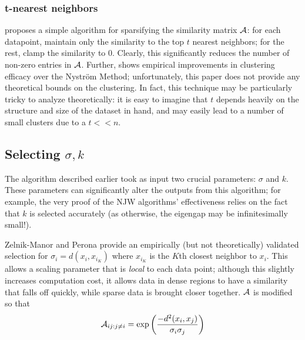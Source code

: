 \subsubsection{t-nearest neighbors}
\cite{song2008parallel} proposes a simple algorithm for sparsifying the similarity matrix
$\mathcal{A}$: for each datapoint, maintain only the similarity to the top $t$ nearest
neighbors; for the rest, clamp the similarity to $0$. Clearly, this significantly
reduces the number of non-zero entries in $\mathcal{A}$. Further,
\cite{song2008parallel} shows empirical improvements in clustering efficacy
over the Nystr\"{o}m Method; unfortunately, this paper does not provide any
theoretical bounds on the clustering. In fact, this technique may be
particularly tricky to analyze theoretically: it is easy to imagine that $t$
depends heavily on the structure and size of the dataset in hand, and may
easily lead to a number of small clusters due to a $t << n$.

\subsection{Selecting $\sigma, k$}
The algorithm described earlier took as input two crucial parameters: $\sigma$
and $k$. These parameters can significantly alter the outputs from this
algorithm; for example, the very proof of the NJW algorithms' effectiveness
relies on the fact that $k$ is selected accurately (as otherwise, the eigengap
may be infinitesimally small!).

Zelnik-Manor and Perona \cite{zelnik2004self} provide an empirically (but not
theoretically) validated selection for $\sigma_i = d(x_i, x_{i_K})$ where
$x_{i_K}$ is the $K$th closest neighbor to $x_i$. This allows a scaling
parameter that is \textit{local} to each data point; although this slightly
increases computation cost, it allows data in dense regions to have a
similarity that falls off quickly, while sparse data is brought closer
together. $\mathcal{A}$ is modified so that \[ \mathcal{A}_{ij : j \neq i} =
\exp{\left(\frac{-d^2(x_i,x_j)}{\sigma_i \sigma_j}\right)} \]

